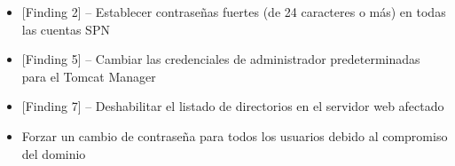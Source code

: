 \begin{itemize}
\item {[Finding 2] – Establecer contraseñas fuertes (de 24 caracteres o más) en todas las cuentas SPN}
\item {[Finding 5] – Cambiar las credenciales de administrador predeterminadas para el Tomcat Manager}
\item {[Finding 7] – Deshabilitar el listado de directorios en el servidor web afectado}
\item Forzar un cambio de contraseña para todos los usuarios debido al compromiso del dominio
\end{itemize}

